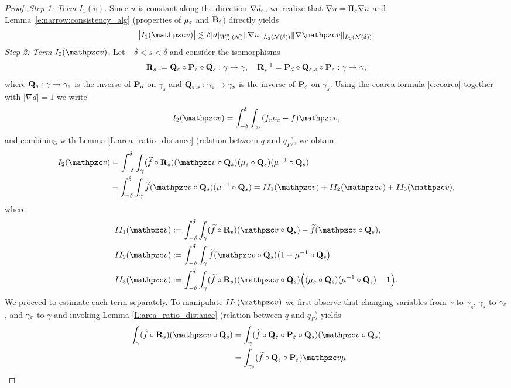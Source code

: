 \begin{proof}
\medskip\noindent
{\it Step 1: Term $I_1(v)$.}
Since $u$ is constant along the direction $\nabla d_\varepsilon$, we realize that
$\nabla u = \Pi_{\varepsilon}\nabla u$ and
Lemma~\ref{e:narrow:consistency_alg} (properties of ${\mu_{\varepsilon}}$ and ${\mathbf{B}_\varepsilon}$) directly yields
$$
\big| I_1(\tv) \big| \lesssim \delta  |d|_{W^2_\infty(\mathcal{N})}  \| \nabla u \|_{L_2(\mathcal N(\delta))} \| \nabla \tv \|_{L_2(\mathcal N(\delta))}.
$$
\medskip\noindent
{\it Step 2: Term $I_2(\tv)$.} Let $-\delta<s<\delta$ and consider the isomorphisms
%
$$
{\bf R}_s:={\bf Q}_{\varepsilon} \circ {\bf P}_{\varepsilon} \circ {\bf Q}_s: \gamma \to \gamma,
\quad
{\bf R}^{-1}_s = {\bf P}_d \circ {\bf Q}_{\varepsilon,s} \circ {\bf P}_{\varepsilon} : \gamma \to \gamma,
$$
%
where ${\bf Q}_s:\gamma\to\gamma_s$ is the inverse of ${\bf P}_d$ on $\gamma_s$ and ${\bf Q}_{\varepsilon,s}:{\gamma_\varepsilon}\to\gamma_s$ is the inverse of ${\bf P}_{\varepsilon}$ on $\gamma_s$. Using the coarea formula \eqref{e:coarea} together with $ |\nabla d|=1$ we write
%
\[
I_2(\tv) = \int_{-\delta}^\delta \int_{\gamma_s} (\fe\mue-f) \tv,
\]
%
and combining with Lemma \ref{L:area_ratio_distance} (relation between $q$ and
$q_\Gamma$), we obtain
%
\begin{align*}
  I_2(\tv) &= \int_{-\delta}^\delta \int_\gamma (\wf \circ \bRs)
  (\tv\circ\bQs) (\mue \circ \bQs) (\mu^{-1} \circ \bQs)
  \\
  & - \int_{-\delta}^\delta \int_\gamma \wf (\tv\circ\bQs) (\mu^{-1} \circ \bQs)
  = II_1(\tv) + II_2(\tv) + II_3(\tv),
\end{align*}
%
where
%
\begin{align*}
  II_1(\tv) &:= \int_{-\delta}^\delta \int_\gamma (\wf \circ \bRs) (\tv\circ\bQs)
  - \wf (\tv\circ\bQs),
  \\
  II_2(\tv) &:= \int_{-\delta}^\delta \int_\gamma \wf (\tv\circ\bQs) \big(1 - \mu^{-1}\circ\bQs  \big)
  \\
  II_3(\tv) &:= \int_{-\delta}^\delta \int_\gamma (\wf \circ \bRs) (\tv\circ\bQs)
  \Big( (\mue \circ \bQs) (\mu^{-1} \circ \bQs) - 1 \Big).
\end{align*}
%  
We proceed to estimate each term separately. To manipulate $II_1(\tv)$ we first observe that
changing variables from $\gamma$ to $\gamma_s$, $\gamma_s$ to ${\gamma_\varepsilon}$,
and ${\gamma_\varepsilon}$ to $\gamma$ and invoking Lemma \ref{L:area_ratio_distance} (relation between $q$ and $q_\Gamma$) yields
%
\begin{equation}
\begin{split}
  \int_\gamma (\wf \circ \bRs) (\tv\circ\bQs) &=
  \int_\gamma (\wf \circ \bQe \circ \bPe \circ \bQs) (\tv\circ\bQs)
  \\ &=
  \int_{\gamma_s} (\wf \circ \bQe \circ \bPe) \tv \mu

\end{split}
\end{equation}
\end{proof}
